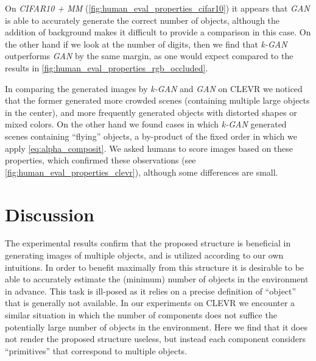 \documentclass{article}
\begin{document}
On \emph{CIFAR10 + MM} (\autoref{fig:human_eval_properties_cifar10}) it appears that \emph{GAN} is able to accurately generate the correct number of objects, although the addition of background makes it difficult to provide a comparison in this case.
On the other hand if we look at the number of digits, then we find that \emph{k-GAN} outperforms \emph{GAN} by the same margin, as one would expect compared to the results in \autoref{fig:human_eval_properties_rgb_occluded}.

In comparing the generated images by \emph{k-GAN} and \emph{GAN} on CLEVR we noticed that the former generated more crowded scenes (containing multiple large objects in the center), and more frequently generated objects with distorted shapes or mixed colors.
On the other hand we found cases in which \emph{k-GAN} generated scenes containing ``flying'' objects, a by-product of the fixed order in which we apply \eqref{eq:alpha_composit}.
We asked humans to score images based on these properties, which confirmed these observations (see \autoref{fig:human_eval_properties_clevr}), although some differences are small.


\section{Discussion}
\vspace{-0.2cm}%
The experimental results confirm that the proposed structure is beneficial in generating images of multiple objects, and is utilized according to our own intuitions.
In order to benefit maximally from this structure it is desirable to be able to accurately estimate the (minimum) number of objects in the environment in advance.
This task is ill-posed as it relies on a precise definition of ``object'' that is generally not available.
In our experiments on CLEVR we encounter a similar situation in which the number of components does not suffice the potentially large number of objects in the environment.
Here we find that it does not render the proposed structure useless, but instead each component considers ``primitives'' that correspond to multiple objects.
\end{document}
